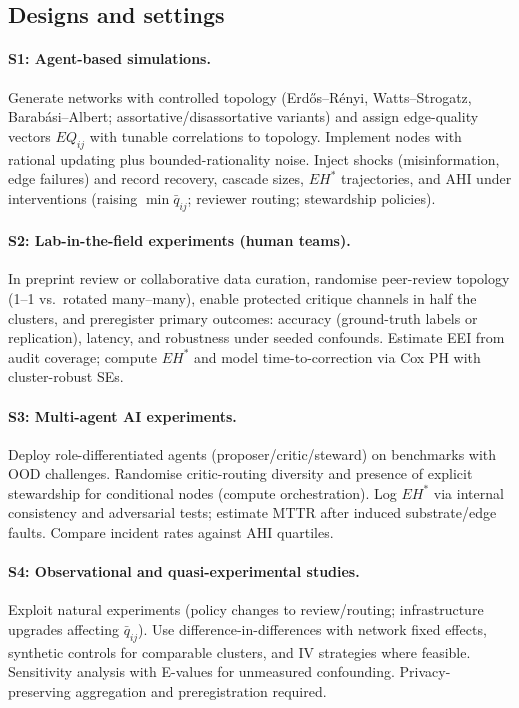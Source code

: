 \documentclass[12pt]{article}
\begin{document}
\subsection{Designs and settings}
\paragraph{S1: Agent-based simulations.} 
Generate networks with controlled topology (Erd\H{o}s--R\'enyi, Watts--Strogatz, Barab\'asi--Albert; assortative/disassortative variants) and assign edge-quality vectors $EQ_{ij}$ with tunable correlations to topology. Implement nodes with rational updating plus bounded-rationality noise. Inject shocks (misinformation, edge failures) and record recovery, cascade sizes, $EH^{\ast}$ trajectories, and AHI under interventions (raising $\min\bar{q}_{ij}$; reviewer routing; stewardship policies).

\paragraph{S2: Lab-in-the-field experiments (human teams).} 
In preprint review or collaborative data curation, randomise peer-review topology (1--1 vs.\ rotated many--many), enable protected critique channels in half the clusters, and preregister primary outcomes: accuracy (ground-truth labels or replication), latency, and robustness under seeded confounds. Estimate EEI from audit coverage; compute $EH^{\ast}$ and model time-to-correction via Cox PH with cluster-robust SEs.

\paragraph{S3: Multi-agent AI experiments.}
Deploy role-differentiated agents (proposer/critic/steward) on benchmarks with OOD challenges. Randomise critic-routing diversity and presence of explicit stewardship for conditional nodes (compute orchestration). Log $EH^{\ast}$ via internal consistency and adversarial tests; estimate MTTR after induced substrate/edge faults. Compare incident rates against AHI quartiles.

\paragraph{S4: Observational and quasi-experimental studies.}
Exploit natural experiments (policy changes to review/routing; infrastructure upgrades affecting $\bar{q}_{ij}$). Use difference-in-differences with network fixed effects, synthetic controls for comparable clusters, and IV strategies where feasible. Sensitivity analysis with E-values for unmeasured confounding. Privacy-preserving aggregation and preregistration required.
\end{document}

